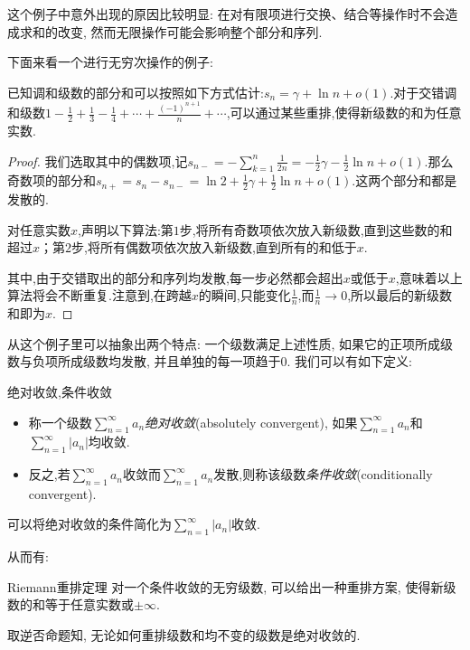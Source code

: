 这个例子中意外出现的原因比较明显: 在对有限项进行交换、结合等操作时不会造成求和的改变, 然而无限操作可能会影响整个部分和序列. 

下面来看一个进行无穷次操作的例子:

\begin{example}
	已知调和级数的部分和可以按照如下方式估计:$s_n=\gamma + \ln n + o(1)$.对于交错调和级数$1-\frac{1}{2}+\frac{1}{3}-\frac{1}{4}+\cdots + \frac{(-1)^{n+1}}{n}+\cdots $,可以通过某些重排,使得新级数的和为任意实数.
\end{example}
\begin{proof}
	我们选取其中的偶数项,记$s_{n-}=-\sum_{k=1}^{n} \frac{1}{2n} = -\frac{1}{2}\gamma -\frac{1}{2}\ln n+o(1)$.那么奇数项的部分和$s_{n+}=s_n-s_{n-}=\ln 2+\frac{1}{2}\gamma + \frac{1}{2}\ln n + o(1)$.这两个部分和都是发散的.
	
	对任意实数$x$,声明以下算法:第$1$步,将所有奇数项依次放入新级数,直到这些数的和超过$x$；第$2$步,将所有偶数项依次放入新级数,直到所有的和低于$x$.
	
	其中,由于交错取出的部分和序列均发散,每一步必然都会超出$x$或低于$x$,意味着以上算法将会不断重复.注意到,在跨越$x$的瞬间,只能变化$\frac{1}{n}$,而$\frac{1}{n} \to 0$,所以最后的新级数和即为$x$.
\end{proof}

从这个例子里可以抽象出两个特点: 一个级数满足上述性质, 如果它的正项所成级数与负项所成级数均发散, 并且单独的每一项趋于$0$. 我们可以有如下定义: 

\begin{definition}{绝对收敛,条件收敛}
	\vspace{-2em}
	\begin{itemize}
		\item 称一个级数$\sum_{n=1}^{\infty} a_n$\textit{绝对收敛}(absolutely convergent), 如果$\sum_{n=1}^{\infty} a_n$和$\sum_{n=1}^{\infty} |a_n|$均收敛. 
		\item 反之,若$\sum_{n=1}^{\infty} a_n$收敛而$\sum_{n=1}^{\infty} a_n$发散,则称该级数\textit{条件收敛}(conditionally convergent). 
	\end{itemize}
\end{definition}
\begin{remark}
	可以将绝对收敛的条件简化为$\sum_{n=1}^{\infty} |a_n|$收敛.
\end{remark}

从而有:

\begin{theorem}{Riemann重排定理}
	对一个条件收敛的无穷级数, 可以给出一种重排方案, 使得新级数的和等于任意实数或$\pm \infty$. 
\end{theorem}
\begin{remark}
	取逆否命题知, 无论如何重排级数和均不变的级数是绝对收敛的. 
\end{remark}

